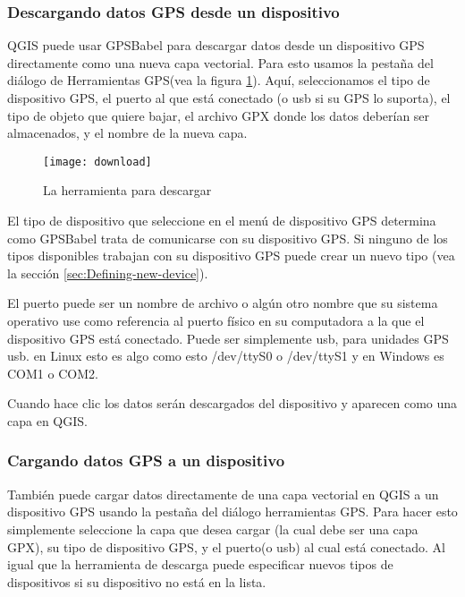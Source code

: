 \subsubsection{Descargando datos GPS desde un dispositivo}

QGIS puede usar GPSBabel para descargar datos desde un dispositivo GPS directamente como una nueva capa vectorial.
Para esto usamos la pestaña  del diálogo de Herramientas GPS(vea la figura \ref{figure_download}). Aquí, seleccionamos el tipo de dispositivo GPS, el puerto al que está conectado (o usb si su GPS lo suporta), el tipo de objeto que quiere bajar, el archivo GPX donde los datos deberían ser almacenados, y el nombre de la nueva capa.

\begin{figure}[ht]
   \begin{center}
\caption{\label{figure_download}La herramienta para descargar \nixcaption}
\texttt{[image: download]}
   \end{center}
\end{figure}

El tipo de dispositivo que seleccione en el menú de dispositivo GPS determina como GPSBabel trata de comunicarse con su dispositivo GPS.
Si ninguno de los tipos disponibles trabajan con su dispositivo GPS puede crear un nuevo tipo (vea la sección \ref{sec:Defining-new-device}).

El puerto puede ser un nombre de archivo o algún otro nombre que su sistema operativo use como referencia al puerto físico en su computadora a la que el dispositivo GPS está conectado. Puede ser simplemente usb, para unidades GPS usb.
\nix en Linux esto es algo como esto /dev/ttyS0 o /dev/ttyS1 y en \win Windows es COM1 o COM2.

Cuando hace clic  los datos serán descargados del dispositivo y aparecen como una capa en QGIS.

\subsubsection{Cargando datos GPS a un dispositivo}

También puede cargar datos directamente de una capa vectorial en QGIS a un dispositivo GPS usando la pestaña  del diálogo herramientas GPS. Para hacer esto simplemente seleccione la capa que desea cargar (la cual debe ser una capa GPX), 
su tipo de dispositivo GPS, y el puerto(o usb) al cual está conectado.
Al igual que la herramienta de descarga puede especificar nuevos tipos de dispositivos si su dispositivo no está en la lista.

